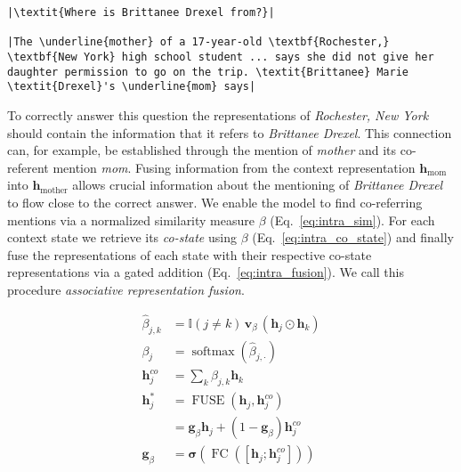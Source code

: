 \documentclass[11pt,a4paper]{article}
\begin{document}
\begin{mdframed}[roundcorner=2pt]
\begin{lstlisting}[basicstyle=\small\normalfont]
|\textit{Where is Brittanee Drexel from?}|

|The \underline{mother} of a 17-year-old \textbf{Rochester,} \textbf{New York} high school student ... says she did not give her daughter permission to go on the trip. \textit{Brittanee} Marie \textit{Drexel}'s \underline{mom} says|
\end{lstlisting}
\end{mdframed}
\noindent
To correctly answer this question the representations of \textit{Rochester, New York} should contain the information that it refers to \textit{Brittanee Drexel}. This connection can, for example, be established through the mention of \textit{mother} and its co-referent mention \textit{mom}. Fusing information from the context representation $\boldsymbol{h}_\text{mom}$ into $\boldsymbol{h}_\text{mother}$ allows crucial information about the mentioning of \textit{Brittanee Drexel} to flow close to the correct answer. We enable the model to find co-referring mentions via a normalized similarity measure $\beta$ (Eq.~\ref{eq:intra_sim}). For each context state we retrieve its \textit{co-state} using $\beta$ (Eq.~\ref{eq:intra_co_state}) and finally fuse the representations of each state with their respective co-state representations via a gated addition (Eq.~\ref{eq:intra_fusion}). We call this procedure \textit{associative representation fusion}. 

\begin{align}
    \hat{\beta}_{j,k} &= \mathbb{I}(j \neq k) \, \boldsymbol{v}_{\beta} \, ( \boldsymbol{h}_j \odot \boldsymbol{h}_k ) \nonumber \\
    \beta_j &= \operatorname{softmax}(\hat{\beta}_{j,\cdot}) \label{eq:intra_sim} \\
    \boldsymbol{h}_j^{co} &= \sum_k \beta_{j,k}  \boldsymbol{h}_k  \label{eq:intra_co_state} \\    
    \boldsymbol{h}_j^\ast &= \operatorname{FUSE}(\boldsymbol{h}_j, \boldsymbol{h}_j^{co}) \nonumber \\
    &= \boldsymbol{g}_\beta \boldsymbol{h}_j + (1-\boldsymbol{g}_\beta)\boldsymbol{h}_j^{co}
    \label{eq:intra_fusion} \\
    \boldsymbol{g}_\beta &= \boldsymbol{\sigma}(\operatorname{FC}([\boldsymbol{h}_j;\boldsymbol{h}_j^{co}])) \nonumber
\end{align}
\end{document}
